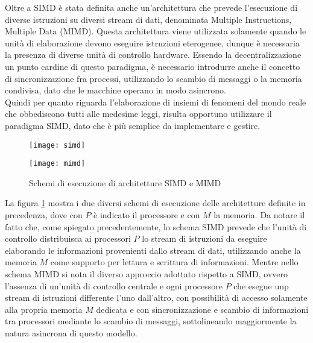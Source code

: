 Oltre a SIMD è stata definita anche un'architettura che prevede
l'esecuzione di diverse istruzioni su diversi stream di dati, denominata
Multiple Instructions, Multiple Data (MIMD)\cite{duncan1990survey}.
Questa architettura viene utilizzata solamente quando le unità di elaborazione
devono eseguire istruzioni eterogenee, dunque è necessaria la presenza
di diverse unità di controllo hardware.
Essendo la decentralizzazione un punto cardine
di questo paradigma, è necessario introdurre anche il concetto di
sincronizzazione fra processi, utilizzando lo scambio di messaggi o
la memoria condivisa, dato che le macchine operano in modo asincrono.
\\
Quindi per quanto riguarda l'elaborazione di insiemi di fenomeni del mondo reale
che obbediscono tutti alle medesime leggi,
risulta opportuno utilizzare il paradigma SIMD, dato che è più semplice da
implementare e gestire.

\begin{figure}[H]
    \begin{minipage}[b]{.5\linewidth}
        \centering
        \texttt{[image: simd]}
    \end{minipage}
    \begin{minipage}[b]{.5\linewidth}
        \centering
        \texttt{[image: mimd]}
    \end{minipage}
    \caption{Schemi di esecuzione di architetture SIMD e MIMD}
    \label{fig:simd-mimd}
\end{figure}

La figura \ref{fig:simd-mimd} mostra i due diversi schemi di esecuzione
delle architetture definite in precedenza, dove con $P$ è indicato il processore
e con $M$ la memoria. Da notare il fatto che, come spiegato precedentemente,
lo schema SIMD prevede che l'unità di controllo distribuisca ai processori $P$
lo stream di istruzioni da eseguire elaborando le informazioni
provenienti dallo stream di dati, utilizzando anche la memoria $M$ come supporto
per lettura e scrittura di informazioni. Mentre nello schema MIMD si nota
il diverso approccio adottato rispetto a SIMD, ovvero l'assenza di un'unità
di controllo centrale e ogni processore $P$ che esegue
unp stream di istruzioni differente l'uno dall'altro,
con possibilità di accesso solamente alla
propria memoria $M$ dedicata e con sincronizzazione e scambio di informazioni
tra processori mediante lo scambio di messaggi, sottolineando maggiormente
la natura asincrona di questo modello.

